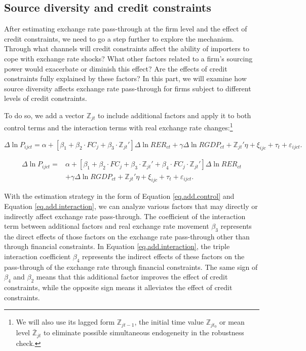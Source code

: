 \subsection{Source diversity and credit constraints}

After estimating exchange rate pass-through at the firm level and the effect of credit constraints, we need to go a step further to explore the mechanism. Through what channels will credit constraints affect the ability of importers to cope with exchange rate shocks? What other factors related to a firm's sourcing power would exacerbate or diminish this effect? Are the effects of credit constraints fully explained by these factors? In this part, we will examine how source diversity affects exchange rate pass-through for firms subject to different levels of credit constraints.

To do so, we add a vector $\mathbb{Z}_{jt}$ to include additional factors and apply it to both control terms and the interaction terms with real exchange rate changes:\footnote{We will also use its lagged form $\mathbb{Z}_{jt-1}$, the initial time value $\mathbb{Z}_{jt_0}$ or mean level $\bar{\mathbb{Z}}_{jt}$ to eliminate possible simultaneous endogeneity in the robustness check.} 

\begin{equation}
	\Delta \ln P_{ijct}=\alpha+[\beta_{1}+ \beta_{2} \cdot FC_{j}+\beta_{3} \cdot {\mathbb{Z}_{jt}}'] \Delta \ln RER_{ct} +\gamma \Delta \ln RGDP_{ct}+ {\mathbb{Z}_{jt}}' \eta+\xi_{ijc}+\tau_{t} +\varepsilon_{ijct}.
	\label{eq.add.control}
\end{equation}

\begin{equation}
	\begin{aligned}
	\Delta \ln P_{ijct}=&\alpha+[\beta_{1}+ \beta_{2} \cdot FC_{j}+\beta_{3} \cdot {\mathbb{Z}_{jt}}'+\beta_{4} \cdot FC_{j} \cdot {\mathbb{Z}_{jt}}'] \Delta \ln RER_{ct} \\ &+\gamma \Delta \ln RGDP_{ct}+ {\mathbb{Z}_{jt}}' \eta+\xi_{ijc}+\tau_{t} +\varepsilon_{ijct}.
	\end{aligned}	
	\label{eq.add.interaction}
\end{equation}

With the estimation strategy in the form of Equation \ref{eq.add.control} and Equation \ref{eq.add.interaction}, we can analyze various factors that may directly or indirectly affect exchange rate pass-through. The coefficient of the interaction term between additional factors and real exchange rate movement $\beta_3$ represents the direct effects of those factors on the exchange rate pass-through other than through financial constraints. In Equation \ref{eq.add.interaction}, the triple interaction coefficient $\beta_4$ represents the indirect effects of these factors on the pass-through of the exchange rate through financial constraints. The same sign of $\beta_4$ and $\beta_2$ means that this additional factor improves the effect of credit constraints, while the opposite sign means it alleviates the effect of credit constraints. 

